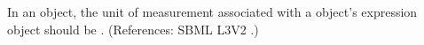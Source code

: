 In an \Event object, the unit of measurement associated with a \Priority
object's  expression object should be .  (References:
SBML L3V2 .)
